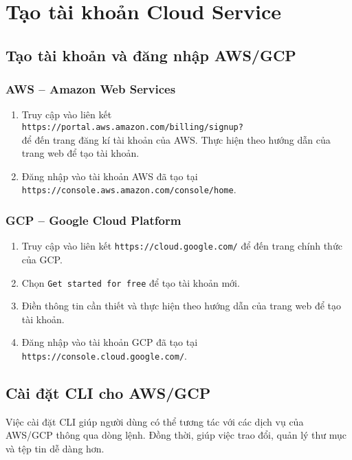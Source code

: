 \chapter{Tạo tài khoản Cloud Service}
\label{Chapter1}

\section{Tạo tài khoản và đăng nhập AWS/GCP}
\subsection{AWS -- Amazon Web Services}
\begin{enumerate}
\item Truy cập vào liên kết \\
\texttt{https://portal.aws.amazon.com/billing/signup?}\\
để đến trang đăng kí tài khoản của AWS.
Thực hiện theo hướng dẫn của trang web để tạo tài khoản.

\item Đăng nhập vào tài khoản AWS đã tạo tại \\
\texttt{https://console.aws.amazon.com/console/home}.
\end{enumerate}

\subsection{GCP -- Google Cloud Platform}
\begin{enumerate}
\item Truy cập vào liên kết \texttt{https://cloud.google.com/} để đến trang chính thức của GCP.
\item Chọn \texttt{Get started for free} để tạo tài khoản mới.
\item Điền thông tin cần thiết và thực hiện theo hướng dẫn của trang web để tạo tài khoản.
\item Đăng nhập vào tài khoản GCP đã tạo tại \\
\texttt{https://console.cloud.google.com/}.
\end{enumerate}

\section{Cài đặt CLI cho AWS/GCP}
Việc cài đặt CLI giúp người dùng có thể tương tác với các dịch vụ của AWS/GCP thông qua dòng lệnh. Đồng thời, giúp việc trao đổi, quản lý thư mục và tệp tin dễ dàng hơn.
